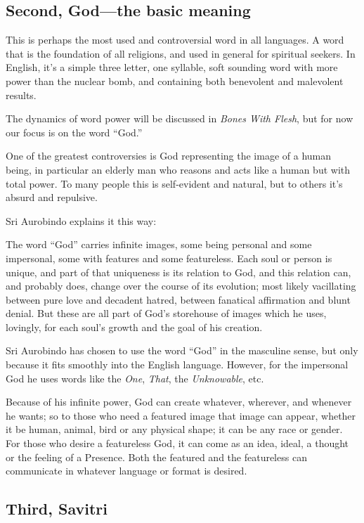 \documentclass[12pt,a4paper]{book}
\begin{document}
\subsection*{Second, God---the basic meaning}


This is perhaps the most used and controversial word in all
languages. A word that is the foundation of all religions, and used in
general for spiritual seekers. In English, it's a simple three letter,
one syllable, soft sounding word with more power than the nuclear
bomb, and containing both benevolent and malevolent results.

The dynamics of word power will be discussed in \emph{Bones With Flesh}, but
for now our focus is on the word ``God.''

One of the greatest controversies is God representing the image of a
human being, in particular an elderly man who reasons and acts like a
human but with total power. To many people this is self-evident and
natural, but to others it's absurd and repulsive.

\noindent Sri Aurobindo explains it this way:

The word ``God'' carries infinite images, some being personal and some
impersonal, some with features and some featureless. Each soul or
person is unique, and part of that uniqueness is its relation to God,
and this relation can, and probably does, change over the course of
its evolution; most likely vacillating between pure love and decadent
hatred, between fanatical affirmation and blunt denial. But these are
all part of God's storehouse of images which he uses, lovingly, for
each soul's growth and the goal of his creation.

Sri Aurobindo has chosen to use the word ``God'' in the masculine
sense, but only because it fits smoothly into the English
language. However, for the impersonal God he uses words like the
\emph{One}, \emph{That}, the \emph{Unknowable}, etc.

Because of his infinite power, God can create whatever, wherever, and
whenever he wants; so to those who need a featured image that image
can appear, whether it be human, animal, bird or any physical shape;
it can be any race or gender. For those who desire a featureless God,
it can come as an idea, ideal, a thought or the feeling of a
Presence. Both the featured and the featureless can communicate in
whatever language or format is desired.


\subsection*{Third, Savitri}
\end{document}
